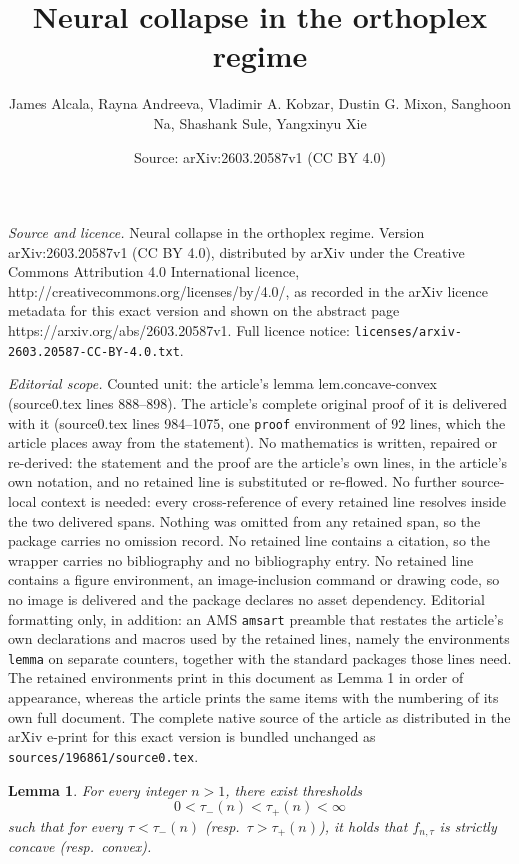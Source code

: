 \documentclass[10pt,a4paper]{amsart}
\title{Neural collapse in the orthoplex regime}
\author{James Alcala, Rayna Andreeva, Vladimir A. Kobzar, Dustin G. Mixon, Sanghoon Na, Shashank Sule, Yangxinyu Xie}
\date{Source: arXiv:2603.20587v1 (CC BY 4.0)}
\newtheorem{lemma}{Lemma}
\begin{document}
\maketitle

\noindent\emph{Source and licence.} Neural collapse in the orthoplex regime. Version arXiv:2603.20587v1 (CC BY 4.0), distributed by arXiv under the Creative Commons Attribution 4.0 International licence, http://creativecommons.org/licenses/by/4.0/, as recorded in the arXiv licence metadata for this exact version and shown on the abstract page https://arxiv.org/abs/2603.20587v1. Full licence notice: \texttt{licenses/arxiv-2603.20587-CC-BY-4.0.txt}.\par\smallskip

\noindent\textit{Editorial scope.} Counted unit: the article's lemma lem.concave-convex (source0.tex lines 888--898). The article's complete original proof of it is delivered with it (source0.tex lines 984--1075, one \texttt{proof} environment of 92 lines, which the article places away from the statement). No mathematics is written, repaired or re-derived: the statement and the proof are the article's own lines, in the article's own notation, and no retained line is substituted or re-flowed.  No further source-local context is needed: every cross-reference of every retained line resolves inside the two delivered spans.  Nothing was omitted from any retained span, so the package carries no omission record.  No retained line contains a citation, so the wrapper carries no bibliography and no bibliography entry.  No retained line contains a figure environment, an image-inclusion command or drawing code, so no image is delivered and the package declares no asset dependency.  Editorial formatting only, in addition: an AMS \texttt{amsart} preamble that restates the article's own declarations and macros used by the retained lines, namely the environments \texttt{lemma} on separate counters, together with the standard packages those lines need.  The retained environments print in this document as Lemma 1 in order of appearance, whereas the article prints the same items with the numbering of its own full document.  The complete native source of the article as distributed in the arXiv e-print for this exact version is bundled unchanged as \texttt{sources/196861/source0.tex}.
\begin{lemma}
\label{lem.concave-convex}
For every integer $n>1$, there exist thresholds 
\[
0
<\tau_-(n)
<\tau_+(n)
<\infty
\]
such that for every $\tau<\tau_-(n)$ (resp.\ $\tau>\tau_+(n)$), it holds that $f_{n,\tau}$ is strictly concave (resp.\ convex).
\end{lemma}
\end{document}
